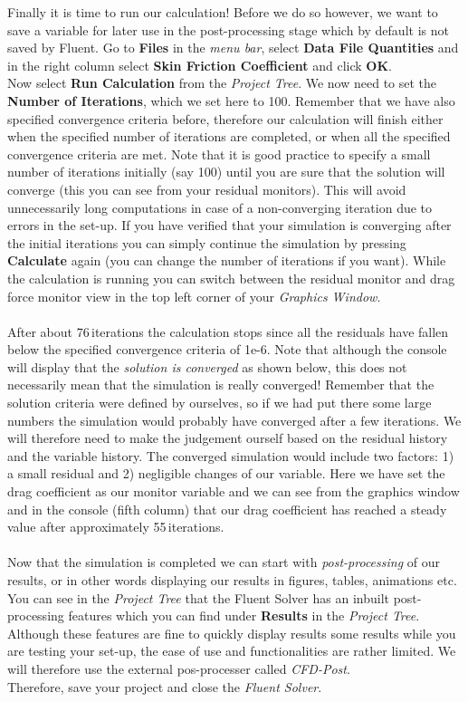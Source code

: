 \documentclass[11pt,a4paper,oneside,hidelinks]{scrartcl}
\newcommand\bfr[1]{\textcolor[rgb]{1,0.00,0.00}{\textbf{\textsf{#1}}}}
\begin{document}
Finally it is time to run our calculation! Before we do so however, we want to save a variable for later use in the post-processing stage which by default is not saved by Fluent. Go to \bfr{Files} in the \emph{menu bar}, select \bfr{Data File Quantities} and in the right column select \bfr{Skin Friction Coefficient} and click \bfr{OK}.
\\
Now select \bfr{Run Calculation} from the \emph{Project Tree}. We now need to set the \bfr{Number of Iterations}, which we set here to 100. Remember that we have also specified convergence criteria before, therefore our calculation will finish either when the specified number of iterations are completed, or when all the specified convergence criteria are met. Note that it is good practice to specify a small number of iterations initially (say 100) until you are sure that the solution will converge (this you can see from your residual monitors). This will avoid unnecessarily long computations in case of a non-converging iteration due to errors in the set-up. If you have verified that your simulation is converging after the initial iterations you can simply continue the simulation by pressing \bfr{Calculate} again (you can change the number of iterations if you want). While the calculation is running you can switch between the residual monitor and drag force monitor view in the top left corner of your \emph{Graphics Window}.
\\
\\
After about 76\,iterations the calculation stops since all the residuals have fallen below the specified convergence criteria of 1e-6. Note that although the console will display that the \emph{solution is converged} as shown below, this does not necessarily mean that the simulation is really converged! Remember that the solution criteria were defined by ourselves, so if we had put there some large numbers the simulation would probably have converged after a few iterations. We will therefore need to make the judgement ourself based on the residual history and the variable history. The converged simulation would include two factors: 1) a small residual and 2) negligible changes of our variable. Here we have set the drag coefficient as our monitor variable and we can see from the graphics window and in the console (fifth column) that our drag coefficient has reached a steady value after approximately 55\,iterations.
\\
\\
Now that the simulation is completed we can start with \emph{post-processing} of our results, or in other words displaying our results in figures, tables, animations etc. You can see in the \emph{Project Tree} that the Fluent Solver has an inbuilt post-processing features which you can find under \bfr{Results} in the \emph{Project Tree}. Although these features are fine to quickly display results some results while you are testing your set-up, the ease of use and functionalities are rather limited. We will therefore use the external pos-processer called \emph{CFD-Post}.
\\
Therefore, save your project and close the \emph{Fluent Solver}.
\end{document}
